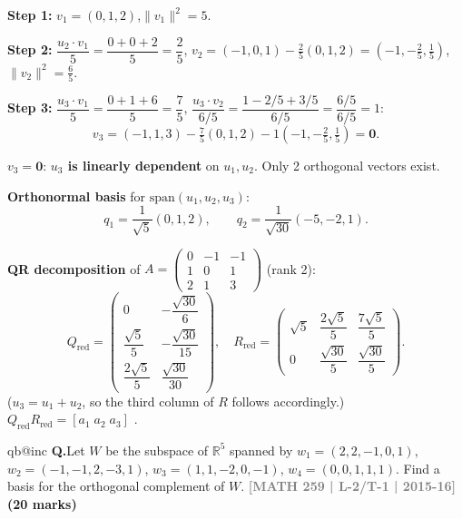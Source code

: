 \documentclass[12pt,a3paper]{article}
\makeatletter
\newcommand{\yr}[1]{\hfill\textcolor{gray}{\small\textbf{[#1]}}}
\newcommand{\mk}[1]{\textcolor{orange!70!black}{\small\textbf{(#1 marks)}}}
\newcounter{qnum}
\newcommand{\Q}[1]{%
  \csname qb@inc\endcsname
  \needspace{4\baselineskip}
  \refstepcounter{qnum}
  \vspace{6pt}
  \noindent\textbf{Q\theqnum.}\enspace #1\par
}
\makeatother
\begin{document}
\begin{tcolorbox}[enhanced,breakable,
  colback=cD!4,colframe=cD,boxrule=0.8pt,arc=5pt,
  title={\textbf{Answer --- Gram-Schmidt $u_1=(0,1,2)$, $u_2=(-1,0,1)$, $u_3=(-1,1,3)$; QR}},
  fonttitle=\bfseries\color{white},colbacktitle=cD]

\textbf{Step 1:} $v_1=(0,1,2)$,\quad $\|v_1\|^2=5$.

\textbf{Step 2:} $\dfrac{u_2\cdot v_1}{5}=\dfrac{0+0+2}{5}=\dfrac{2}{5}$,\quad
$v_2=(-1,0,1)-\tfrac{2}{5}(0,1,2)=\left(-1,-\tfrac{2}{5},\tfrac{1}{5}\right)$,\quad $\|v_2\|^2=\tfrac{6}{5}$.

\textbf{Step 3:} $\dfrac{u_3\cdot v_1}{5}=\dfrac{0+1+6}{5}=\dfrac{7}{5}$,\;
$\dfrac{u_3\cdot v_2}{6/5}=\dfrac{1-2/5+3/5}{6/5}=\dfrac{6/5}{6/5}=1$:
\[
v_3=(-1,1,3)-\tfrac{7}{5}(0,1,2)-1\!\left(-1,-\tfrac{2}{5},\tfrac{1}{5}\right)
=\mathbf{0}.
\]

$v_3=\mathbf{0}$: \textbf{$u_3$ is linearly dependent} on $u_1,u_2$. Only 2 orthogonal vectors exist.

\textbf{Orthonormal basis} for $\mathrm{span}(u_1,u_2,u_3)$:
\[
q_1=\frac{1}{\sqrt{5}}(0,1,2),\qquad
q_2=\frac{1}{\sqrt{30}}(-5,-2,1).
\]

\textbf{QR decomposition} of $A=\begin{pmatrix}0&-1&-1\\1&0&1\\2&1&3\end{pmatrix}$ (rank 2):
\[
Q_{\mathrm{red}}=\begin{pmatrix}
0&-\dfrac{\sqrt{30}}{6}\\[6pt]
\dfrac{\sqrt{5}}{5}&-\dfrac{\sqrt{30}}{15}\\[6pt]
\dfrac{2\sqrt{5}}{5}&\dfrac{\sqrt{30}}{30}
\end{pmatrix},\quad
R_{\mathrm{red}}=\begin{pmatrix}\sqrt{5}&\dfrac{2\sqrt{5}}{5}&\dfrac{7\sqrt{5}}{5}\\[6pt]0&\dfrac{\sqrt{30}}{5}&\dfrac{\sqrt{30}}{5}\end{pmatrix}.
\]
($u_3=u_1+u_2$, so the third column of $R$ follows accordingly.)
$Q_{\mathrm{red}}R_{\mathrm{red}}=[a_1\;a_2\;a_3]$ . \checkmark

\end{tcolorbox}

\Q{Let $W$ be the subspace of $\mathbb{R}^5$ spanned by $w_1 = (2,2,-1,0,1)$, $w_2 = (-1,-1,2,-3,1)$, $w_3 = (1,1,-2,0,-1)$, $w_4 = (0,0,1,1,1)$. Find a basis for the orthogonal complement of $W$.
\yr{MATH 259 | L-2/T-1 | 2015-16} \mk{20}}
\end{document}
